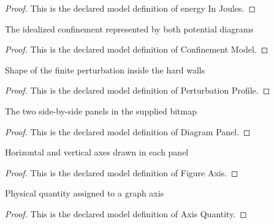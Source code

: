 \begin{proof}
  This is the declared model definition of energy In Joules.
\end{proof}
\begin{definition}
  \label{def:physics:phyx-mini-0545:phyxminiproblems-problemphyxmini0545-confinementmodel}
  The idealized confinement represented by both potential diagrams
\end{definition}
\begin{proof}
  This is the declared model definition of Confinement Model.
\end{proof}
\begin{definition}
  \label{def:physics:phyx-mini-0545:phyxminiproblems-problemphyxmini0545-perturbationprofile}
  Shape of the finite perturbation inside the hard walls
\end{definition}
\begin{proof}
  This is the declared model definition of Perturbation Profile.
\end{proof}
\begin{definition}
  \label{def:physics:phyx-mini-0545:phyxminiproblems-problemphyxmini0545-diagrampanel}
  The two side-by-side panels in the supplied bitmap
\end{definition}
\begin{proof}
  This is the declared model definition of Diagram Panel.
\end{proof}
\begin{definition}
  \label{def:physics:phyx-mini-0545:phyxminiproblems-problemphyxmini0545-figureaxis}
  Horizontal and vertical axes drawn in each panel
\end{definition}
\begin{proof}
  This is the declared model definition of Figure Axis.
\end{proof}
\begin{definition}
  \label{def:physics:phyx-mini-0545:phyxminiproblems-problemphyxmini0545-axisquantity}
  Physical quantity assigned to a graph axis
\end{definition}
\begin{proof}
  This is the declared model definition of Axis Quantity.
\end{proof}
